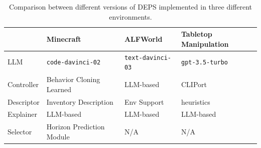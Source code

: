 \begin{table}[H]
\caption{Comparison between different versions of DEPS implemented in three different environments.}
\renewcommand\arraystretch{1.2}
\label{tab:implementation_comparison}
\begin{tabular}{@{}llll@{}}
\toprule
           & \textbf{Minecraft}                             & \textbf{ALFWorld}        & \textbf{Tabletop Manipulation} \\ \midrule
LLM        & \texttt{code-davinci-02}                             & \texttt{text-davinci-03} & \texttt{gpt-3.5-turbo}         \\
Controller & Behavior Cloning Learned                    & LLM-based       & CLIPort               \\
Descriptor & Inventory Description & Env Support     & heuristics            \\
Explainer  & LLM-based                                   & LLM-based       & LLM-based             \\
Selector   & Horizon Prediction Module                   & N/A             & N/A                   \\ \bottomrule
\end{tabular} %
\end{table}